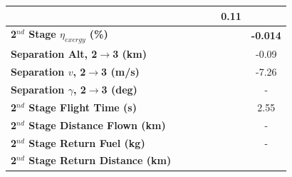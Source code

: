 \begin{table}[ht]
\begin{tabular}{l c c c c c c}
	& \firstsecondSeparationgammamSPARTANNinetyFive
	& \firstsecondSeparationgammamSPARTANStandard
	& \firstsecondSeparationgammamSPARTANOneHundredFive
	& \firstsecondSeparationgammamSPARTANOneHundredTen
	&0.11
	\\
	\hline 
	\textbf{2$^{nd}$ Stage $\eta_{exergy}$ (\%)}
	& \textbf{\secondExergyEffmSPARTANNinety}
	& \textbf{\secondExergyEffmSPARTANNinetyFive}
	& \textbf{\secondExergyEffmSPARTANStandard}
	& \textbf{\secondExergyEffmSPARTANOneHundredFive}
	& \textbf{\secondExergyEffmSPARTANOneHundredTen}
	& \textbf{-0.014}
	\\
	\textbf{Separation Alt, 2$\rightarrow$3 (km)}
	& \secondthirdSeparationAltmSPARTANNinety
	& \secondthirdSeparationAltmSPARTANNinetyFive
	& \secondthirdSeparationAltmSPARTANStandard
	& \secondthirdSeparationAltmSPARTANOneHundredFive
	& \secondthirdSeparationAltmSPARTANOneHundredTen
	&-0.09
	\\
	\textbf{Separation $v$, 2$\rightarrow$3 (m/s)}
	& \secondthirdSeparationvmSPARTANNinety
	& \secondthirdSeparationvmSPARTANNinetyFive
	& \secondthirdSeparationvmSPARTANStandard
	& \secondthirdSeparationvmSPARTANOneHundredFive
	& \secondthirdSeparationvmSPARTANOneHundredTen
	&-7.26
	\\
	\textbf{Separation $\gamma$, 2$\rightarrow$3 (deg)}
	& \secondthirdSeparationgammamSPARTANNinety
	& \secondthirdSeparationgammamSPARTANNinetyFive
	& \secondthirdSeparationgammamSPARTANStandard
	& \secondthirdSeparationgammamSPARTANOneHundredFive
	& \secondthirdSeparationgammamSPARTANOneHundredTen
	& -
	\\
	\textbf{2$^{nd}$ Stage Flight Time (s)}
	& \secondFlightTimemSPARTANNinety
	& \secondFlightTimemSPARTANNinetyFive
	& \secondFlightTimemSPARTANStandard
	& \secondFlightTimemSPARTANOneHundredFive
	& \secondFlightTimemSPARTANOneHundredTen
	&2.55
	\\
	\textbf{2$^{nd}$ Stage Distance Flown (km)}
	& \SecondDistmSPARTANNinety
	& \SecondDistmSPARTANNinetyFive
	& \SecondDistmSPARTANStandard
	& \SecondDistmSPARTANOneHundredFive
	& \SecondDistmSPARTANOneHundredTen
	& -
	\\
	\textbf{2$^{nd}$ Stage Return Fuel (kg)}
	& \returnFuelmSPARTANNinety
	& \returnFuelmSPARTANNinetyFive
	& \returnFuelmSPARTANStandard
	& \returnFuelmSPARTANOneHundredFive
	& \returnFuelmSPARTANOneHundredTen
	& -
	\\
	\textbf{2$^{nd}$ Stage Return Distance (km)}
	& \returnDistmSPARTANNinety
	& \returnDistmSPARTANNinetyFive
	& \returnDistmSPARTANStandard
	& \returnDistmSPARTANOneHundredFive
	& \returnDistmSPARTANOneHundredTen

\end{tabular}
\end{table}
